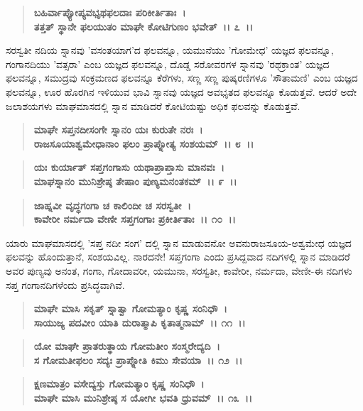 \begin{verse}
\textbf{ಬಹಿರ್ವಾಪ್ಯೋಪ್ಯವಭೃಥಫಲದಾಃ ಪರಿಕೀರ್ತಿತಾಃ~।}\\\textbf{ತತ್ತತ್ ಸ್ಥಾನೇ ಫಲಯುತಂ ಮಾಘೇ ಕೋಟಿಗುಣಂ ಭವೇತ್~।। ೭~।।}
\end{verse}

ಸರಸ್ವತೀ ನದಿಯ ಸ್ನಾನವು 'ವಸಂತಯಾಗ'ದ ಫಲವನ್ನೂ, ಯಮುನೆಯು 'ಗೋಮೇಧ' ಯಜ್ಞದ ಫಲವನ್ನೂ, ಗಂಗಾನದಿಯು 'ವತ್ಸರಾ' ಎಂಬ ಯಜ್ಞದ ಫಲವನ್ನೂ, ದೊಡ್ಡ ಸರೋವರಗಳ ಸ್ನಾನವು 'ರಥಕ್ರಾಂತ' ಯಜ್ಞದ ಫಲವನ್ನೂ, ಸಮುದ್ರವು ಸಂಕ್ರಮಣದ ಫಲವನ್ನೂ ಕೆರೆಗಳು, ಸಣ್ಣ ಸಣ್ಣ ಪುಷ್ಕರಣಿಗಳೂ 'ಸೌತಾಮಣಿ' ಎಂಬ ಯಜ್ಞದ ಫಲವನ್ನೂ, ಊರ ಹೊರಗಿನ ಇಳಿಯುವ ಭಾವಿ ಸ್ನಾನವು ಯಜ್ಞದ ಅವಭೃತದ ಫಲವನ್ನೂ ಕೊಡುತ್ತವೆ. ಆದರೆ ಅದೇ ಜಲಾಶಯಗಳು ಮಾಘಮಾಸದಲ್ಲಿ ಸ್ನಾನ ಮಾಡಿದರೆ ಕೋಟಿಯಷ್ಟು ಅಧಿಕ ಫಲವನ್ನು ಕೊಡುತ್ತವೆ.

\begin{verse}
\textbf{ಮಾಘೇ ಸಪ್ತನದೀಸಂಗೇ ಸ್ನಾನಂ ಯಃ ಕುರುತೇ ನರಃ~।}\\\textbf{ರಾಜಸೂಯಾಶ್ವಮೇಧಾನಾಂ ಫಲಂ ಪ್ರಾಪ್ನೋತ್ಯ ಸಂಶಯಮ್~।। ೮~।। }
\end{verse}

\begin{verse}
\textbf{ಯಃ ಕುರ್ಯಾತ್ ಸಪ್ತಗಂಗಾಸು ಯಥಾಪ್ರಾಪ್ತಾಸು ಮಾನವಃ~।}\\\textbf{ಮಾಘಸ್ನಾನಂ ಮುನಿಶ್ರೇಷ್ಠ ತೇಷಾಂ ಪುಣ್ಯಮನಂತಕಮ್~।। ೯~।। }
\end{verse}

\begin{verse}
\textbf{ಜಾಹ್ನವೀ ವೃದ್ಧಗಂಗಾ ಚ ಕಾಲಿಂದೀ ಚ ಸರಸ್ವತೀ~।}\\\textbf{ಕಾವೇರೀ ನರ್ಮದಾ ವೇಣೀ ಸಪ್ತಗಂಗಾಃ ಪ್ರಕೀರ್ತಿತಾಃ~।। ೧೦~।।}
\end{verse}

ಯಾರು ಮಾಘಮಾಸದಲ್ಲಿ 'ಸಪ್ತ ನದೀ ಸಂಗ' ದಲ್ಲಿ ಸ್ನಾನ ಮಾಡುವನೋ ಅವನು\break ರಾಜಸೂಯ-ಅಶ್ವಮೇಧ ಯಜ್ಞದ ಫಲವನ್ನು ಹೊಂದುತ್ತಾನೆ, ಸಂಶಯವಿಲ್ಲ. ನಾರದನೇ! ಸಪ್ತಗಂಗಾ ಎಂದು ಪ್ರಸಿದ್ದವಾದ ನದಿಗಳಲ್ಲಿ ಸ್ನಾನ ಮಾಡಿದರೆ ಅವರ ಪುಣ್ಯವು ಅನಂತ, ಗಂಗಾ, ಗೋದಾವರೀ, ಯಮುನಾ, ಸರಸ್ವತೀ, ಕಾವೇರೀ, ನರ್ಮದಾ, ವೇಣೀ-ಈ ನದಿಗಳು ಸಪ್ತ ಗಂಗಾನದಿಗಳೆಂದು ಪ್ರಸಿದ್ಧವಾಗಿವೆ.

\begin{verse}
\textbf{ಮಾಘೇ ಮಾಸಿ ಸಕೃತ್ ಸ್ನಾತ್ವಾ ಗೋಮತ್ಯಾಂ ಕೃಷ್ಣ ಸಂನಿಧೌ~।}\\\textbf{ಸಾಯುಜ್ಯ ಪದವೀಂ ಯಾತಿ ದುರಾತ್ಮಾಪಿ ಕೃತಾತ್ಮನಾಮ್~।। ೧೧~।। }
\end{verse}

\begin{verse}
\textbf{ಯೋ ಮಾಘೇ ಪ್ರಾತರುತ್ಥಾಯ ಗೋಮತೀಂ ಸಂಸ್ಮರೇದ್ಯದಿ~।}\\\textbf{ಸ ಗೋಮತೀಫಲಂ ಸದ್ಯಃ ಪ್ರಾಪ್ನೋತಿ ಕಿಮು ಸೇವಯಾ~।। ೧೨~।।} 
\end{verse}

\begin{verse}
\textbf{ಕ್ಷಣಮಾತ್ರಂ ವಸೇದ್ಯಸ್ತು ಗೋಮತ್ಯಾಂ ಕೃಷ್ಣ ಸಂನಿಧೌ~।}\\\textbf{ಮಾಘೇ ಮಾಸಿ ಮುನಿಶ್ರೇಷ್ಠ ಸ ಯೋಗೀ ಭವತಿ ಧ್ರುವಮ್~।। ೧೩~।।}
\end{verse}

